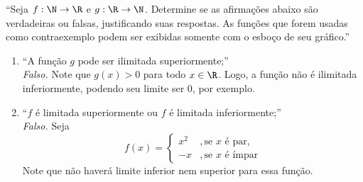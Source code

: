 \enquote{Seja $f : \N \rightarrow \R$ e $g : \R \rightarrow \N$. Determine se as afirmações
abaixo são verdadeiras ou falsas, justificando suas respostas.
As funções que forem usadas como contraexemplo podem ser
exibidas somente com o esboço de seu gráfico.}
\begin{enumerate}
    \item \enquote{A função $g$ pode ser ilimitada superiormente;} \\
    \emph{Falso.} Note que $g(x) > 0$ para todo $x \in \R$. Logo, a função não é ilimitada inferiormente, podendo seu limite ser 0, por exemplo.
    \item \enquote{$f$ é limitada superiormente ou $f$ é limitada inferiormente;} \\
    \emph{Falso.} Seja
    \begin{displaymath}
        f(x) = \left\{
            \begin{aligned}
                x^2 &, \text{se $x$ é par}, \\
                -x &, \text{se $x$ é ímpar}
            \end{aligned}
         \right.
    \end{displaymath}
    Note que não haverá limite inferior nem superior para essa função.
\end{enumerate}
